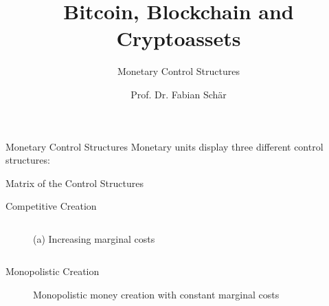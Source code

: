 \documentclass[]{beamer}
\title{Bitcoin, Blockchain and Cryptoassets}
\subtitle{Monetary Control Structures}
\author{Prof. Dr. Fabian Schär}
\institute{University of Basel}
\begin{document}
\thispagestyle{empty}
\begin{frame}[noframenumbering]
	\titlepage
\end{frame}

\begin{frame}{Monetary Control Structures}
	Monetary units display three different control structures:
	\vspace{1.5em}
	\begin{figure}
		
	\end{figure}
\end{frame}

\begin{frame}{Matrix of the Control Structures}
	\begin{figure}
		
	\end{figure}
\end{frame}

\begin{frame}{Competitive Creation}
	\begin{columns}
		\begin{column}{0.5\textwidth}
			\begin{figure}
				
				\caption*{(a) Increasing marginal costs}
			\end{figure}
		\end{column}
		\begin{column}{0.5\textwidth}
			\begin{figure}
			\end{figure}
		\end{column}
	\end{columns}
\end{frame}

\begin{frame}{Monopolistic Creation}
	\begin{figure}
		
		\caption*{Monopolistic money creation with constant marginal costs}
	\end{figure}
\end{frame}
\end{document}
